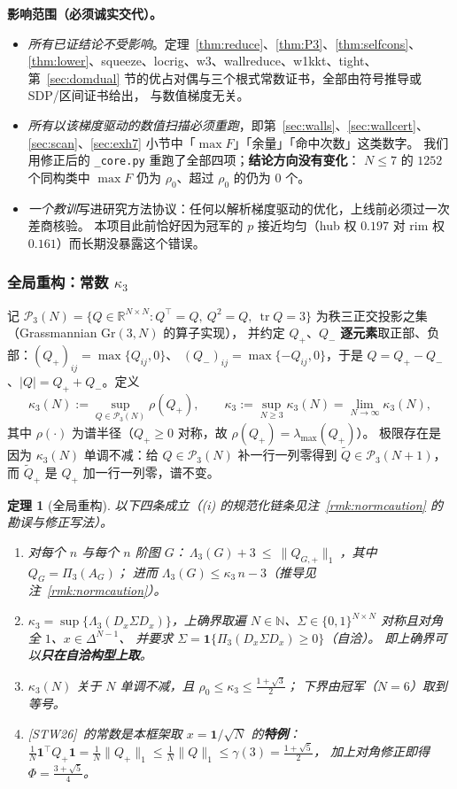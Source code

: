 \documentclass[UTF8,11pt]{ctexart}
\newtheorem{theorem}{定理}[section]
\theoremstyle{definition}
\newcommand{\Lam}{\Lambda}
\newcommand{\tr}{\operatorname{tr}}
\newcommand{\N}{\mathbb{N}}
\newcommand{\STW}{\textup{[STW26]}}
\begin{document}
\textbf{影响范围（必须诚实交代）。}
\begin{itemize}[leftmargin=1.6em,itemsep=1pt]
\item \emph{所有已证结论不受影响}。定理~\ref{thm:reduce}、\ref{thm:P3}、\ref{thm:selfcons}、
\ref{thm:lower}、squeeze、locrig、w3、wallreduce、w1kkt、tight、
第~\ref{sec:domdual} 节的优占对偶与三个根式常数证书，全部由符号推导或 SDP/区间证书给出，
与数值梯度无关。
\item \emph{所有以该梯度驱动的数值扫描必须重跑}，即第~\ref{sec:walls}、\ref{sec:wallcert}、
\ref{sec:scan}、\ref{sec:exh7} 小节中「$\max F$」「余量」「命中次数」这类数字。
我们用修正后的 \texttt{\_core.py} 重跑了全部四项；\textbf{结论方向没有变化}：
$N\le7$ 的 $1252$ 个同构类中 $\max F$ 仍为 $\rho_0$、超过 $\rho_0$ 的仍为 $0$ 个。
\item \emph{一个教训}写进研究方法协议：任何以解析梯度驱动的优化，上线前必须过一次差商核验。
本项目此前恰好因为冠军的 $p$ 接近均匀（hub 权 $0.197$ 对 rim 权 $0.161$）而长期没暴露这个错误。
\end{itemize}

\subsubsection{全局重构：常数 $\kappa_3$}

记 $\mathcal P_3(N)=\{Q\in\mathbb R^{N\times N}:Q^\top=Q,\ Q^2=Q,\ \tr Q=3\}$
为秩三正交投影之集（Grassmannian $\mathrm{Gr}(3,N)$ 的算子实现），
并约定 $Q_+$、$Q_-$ \textbf{逐元素}取正部、负部：$(Q_+)_{ij}=\max\{Q_{ij},0\}$、
$(Q_-)_{ij}=\max\{-Q_{ij},0\}$，于是 $Q=Q_+-Q_-$、$|Q|=Q_++Q_-$。定义
\[
\kappa_3(N):=\sup_{Q\in\mathcal P_3(N)}\rho(Q_+),\qquad
\kappa_3:=\sup_{N\ge3}\kappa_3(N)=\lim_{N\to\infty}\kappa_3(N),
\]
其中 $\rho(\cdot)$ 为谱半径（$Q_+\ge0$ 对称，故 $\rho(Q_+)=\lambda_{\max}(Q_+)$）。
极限存在是因为 $\kappa_3(N)$ 单调不减：给 $Q\in\mathcal P_3(N)$ 补一行一列零得到
$\widetilde Q\in\mathcal P_3(N+1)$，而 $\widetilde Q_+$ 是 $Q_+$ 加一行一列零，谱不变。

\begin{theorem}[全局重构]\label{thm:kappa}
以下四条成立（(i) 的规范化链条见注~\ref{rmk:normcaution} 的勘误与修正写法）。
\begin{enumerate}[label=(\roman*),leftmargin=2em]
\item 对每个 $n$ 与每个 $n$ 阶图 $G$：$\ \Lam_3(G)+3\ \le\ \|Q_{G,+}\|_1\ $，其中 $Q_G=\Pi_3(A_G)$；
进而 $\Lam_3(G)\le\kappa_3\,n-3$（推导见注~\ref{rmk:normcaution}）。
\item $\kappa_3=\sup\{\Lam_3(D_x\Sigma D_x)\}$，上确界取遍
$N\in\N$、$\Sigma\in\{0,1\}^{N\times N}$ 对称且对角全 $1$、$x\in\Delta^{N-1}$、
并要求 $\Sigma=\mathbf 1\{\Pi_3(D_x\Sigma D_x)\ge0\}$（自洽）。
即上确界可以\textbf{只在自洽构型上取}。
\item $\kappa_3(N)$ 关于 $N$ 单调不减，且 $\rho_0\le\kappa_3\le\frac{1+\sqrt3}{2}$；
下界由冠军（$N=6$）取到等号。
\item \STW\ 的常数是本框架取 $x=\mathbf 1/\sqrt N$ 的\textbf{特例}：
$\frac1N\mathbf 1^\top Q_+\mathbf 1=\frac1N\|Q_+\|_1\le\frac1N\|Q\|_1\le\gamma(3)=\frac{1+\sqrt5}{2}$，
加上对角修正即得 $\Phi=\frac{3+\sqrt5}{4}$。
\end{enumerate}
\end{theorem}
\end{document}
